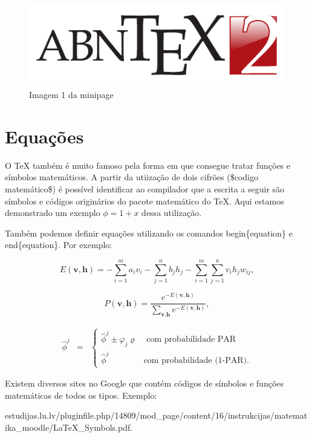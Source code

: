 \begin{figure}[htbp]
    \centering
    \caption{Imagem 1 da minipage} \label{6}
    \includegraphics[scale=0.9]{figs/abntex2-modelo-img-marca.pdf}
\end{figure}

\section{Equações}
\label{s.equacoes}

O TeX também é muito famoso pela forma em que consegue tratar funções e símbolos matemáticos. A partir da utiização de dois cifrões (\$codigo matemático\$) é possível identificar ao compilador que a escrita a seguir são símbolos e códigos originários do pacote matemático do TeX. Aqui estamos demonstrado um exemplo $\phi = 1 + x$ dessa utilização.

Também podemos definir equações utilizando os comandos begin\{equation\} e end\{equation\}. Por exemplo:

\begin{equation}
\label{e.energy_rbm}
E(\textbf{v},\textbf{h})=-\sum_{i=1}^ma_iv_i-\sum_{j=1}^nb_jh_j-\sum_{i=1}^m\sum_{j=1}^nv_ih_jw_{ij},
\end{equation}

\begin{equation}
\label{e.probability_configuration}
P(\textbf{v},\textbf{h})=\frac{e^{-E(\textbf{v},\textbf{h})}}{\displaystyle\sum_{\textbf{v},\textbf{h}}e^{-E(\textbf{v},\textbf{h})}},
\end{equation}

\begin{eqnarray}
\label{eq:par}
\hat{\phi}^j & = & \left\{ \begin{array}{ll} \hat{\phi}^j\pm \varphi_j \varrho  & \mbox{{ com probabilidade PAR}} \\
    \hat{\phi}^j & \mbox{{com probabilidade (1-PAR).}}
\end{array}\right.
\end{eqnarray}

Existem diversos sites no Google que contém códigos de símbolos e funções matemáticas de todos os tipos. Exemplo:\\
\begin{center}
\tiny estudijas.lu.lv/pluginfile.php/14809/mod\_page/content/16/instrukcijas/matematika\_moodle/LaTeX\_Symbols.pdf.
\end{center}

